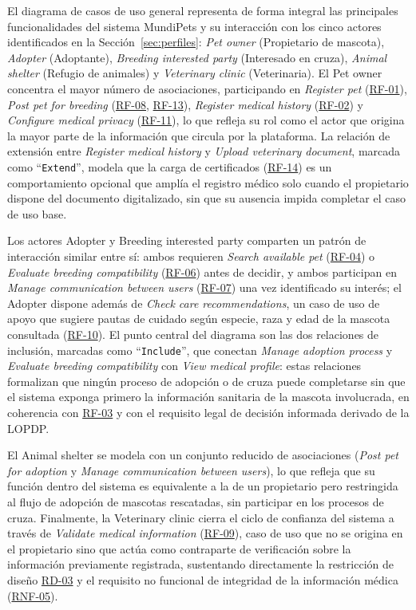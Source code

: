 \documentclass[journal,onecolumn]{IEEEtran}
\begin{document}
	El diagrama de casos de uso general representa de forma integral las
	principales funcionalidades del sistema MundiPets y su interacción con los
	cinco actores identificados en la Sección~\ref{sec:perfiles}: \emph{Pet
	owner} (Propietario de mascota), \emph{Adopter} (Adoptante), \emph{Breeding
	interested party} (Interesado en cruza), \emph{Animal shelter} (Refugio de
	animales) y \emph{Veterinary clinic} (Veterinaria). El Pet owner concentra
	el mayor número de asociaciones, participando en \emph{Register pet}
	(\hyperref[tab:RF-01]{RF-01}), \emph{Post pet for breeding} (\hyperref[tab:RF-08]{RF-08}, \hyperref[tab:RF-13]{RF-13}), \emph{Register
	medical history} (\hyperref[tab:RF-02]{RF-02}) y \emph{Configure medical privacy} (\hyperref[tab:RF-11]{RF-11}), lo
	que refleja su rol como el actor que origina la mayor parte de la
	información que circula por la plataforma. La relación de extensión entre
	\emph{Register medical history} y \emph{Upload veterinary document},
	marcada como \enquote{\texttt{Extend}}, modela que la carga de
	certificados (\hyperref[tab:RF-14]{RF-14}) es un comportamiento opcional que amplía el registro
	médico solo cuando el propietario dispone del documento digitalizado, sin
	que su ausencia impida completar el caso de uso base.

	Los actores Adopter y Breeding interested party comparten un patrón de
	interacción similar entre sí: ambos requieren \emph{Search available pet}
	(\hyperref[tab:RF-04]{RF-04}) o \emph{Evaluate breeding compatibility} (\hyperref[tab:RF-06]{RF-06}) antes de decidir,
	y ambos participan en \emph{Manage communication between users} (\hyperref[tab:RF-07]{RF-07})
	una vez identificado su interés; el Adopter dispone además de
	\emph{Check care recommendations}, un caso de uso de apoyo que sugiere
	pautas de cuidado según especie, raza y edad de la mascota consultada
	(\hyperref[tab:RF-10]{RF-10}). El punto central del diagrama son las dos relaciones de
	inclusión, marcadas como \enquote{\texttt{Include}}, que conectan
	\emph{Manage adoption process} y \emph{Evaluate breeding compatibility}
	con \emph{View medical profile}: estas relaciones formalizan que ningún
	proceso de adopción o de cruza puede completarse sin que el sistema
	exponga primero la información sanitaria de la mascota involucrada, en
	coherencia con \hyperref[tab:RF-03]{RF-03} y con el requisito legal de decisión informada
	derivado de la LOPDP.

	El Animal shelter se modela con un conjunto reducido de asociaciones
	(\emph{Post pet for adoption} y \emph{Manage communication between
	users}), lo que refleja que su función dentro del sistema es equivalente
	a la de un propietario pero restringida al flujo de adopción de mascotas
	rescatadas, sin participar en los procesos de cruza. Finalmente, la
	Veterinary clinic cierra el ciclo de confianza del sistema a través de
	\emph{Validate medical information} (\hyperref[tab:RF-09]{RF-09}), caso de uso que no se origina
	en el propietario sino que actúa como contraparte de verificación sobre la
	información previamente registrada, sustentando directamente la
	restricción de diseño \hyperref[tab:RD-03]{RD-03} y el requisito no funcional de integridad de
	la información médica (\hyperref[tab:RNF-05]{RNF-05}).
\end{document}
